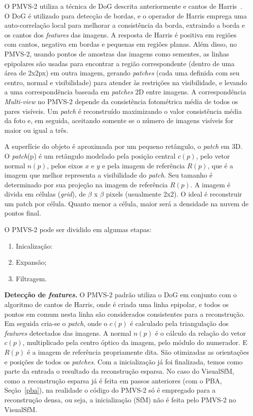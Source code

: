 O PMVS-2 utiliza a técnica de DoG descrita anteriormente e cantos de
Harris~\cite{Harris:Stephens:Edge:Corner}. O DoG é utilizado para detecção de
bordas, e o operador de Harris emprega uma auto-correlação local para
melhorar a consistência da borda, extraindo a borda e os cantos dos
\emph{features} das imagens. A resposta de Harris é positiva em regiões com
cantos, negativa em bordas e pequenas em regiões planas. Além disso, no PMVS-2,
usando pontos de amostras das imagens como sementes, as linhas epipolares são
usadas para encontrar a região correspondente (dentro de uma área de 2x2px) em
outra imagem, gerando \emph{patches} (cada uma definida com seu centro, normal e
visibilidade) para atender às restrições na visibilidade, e levando a uma
correspondência baseada em \emph{patches} 2D entre imagens. A correspondência
\emph{Multi-view} no PMVS-2 depende da
consistência fotométrica média de todos os pares visíveis. Um \emph{patch} é
reconstruído maximizando o valor consistência média da foto e, em
seguida, aceitando somente se o número de imagens visíveis for maior ou igual a
três.

A superfície do objeto é aproximada por um pequeno retângulo, o \emph{patch} em
3D.  O \emph{patch}(p) é um retângulo modelado pela posição central $c(p)$, pelo
vetor normal $n(p)$, pelos eixos $x$ e $y$ e pela imagem de referência $R(p)$,
que é a imagem que melhor representa a visibilidade do \emph{patch}. Seu
tamanho é determinado por sua projeção na imagem de referência $R(p)$.
A imagem é divida em células (\emph{grid}), de $\beta$ x $\beta$ pixels
(usualmente 2x2). O ideal é reconstruir um patch por célula. Quanto menor a
célula, maior será a densidade na nuvem de pontos final.

O PMVS-2 pode ser dividido em algumas etapas:
\begin{enumerate}[leftmargin=2.5cm]
\item{Inicalização:}
\item{Expansão;}
\item{Filtragem.}
\end{enumerate}

\noindent\textbf{Detecção de \emph{features}.}
O PMVS-2 padrão utiliza o DoG em conjunto com o algoritmo de cantos de Harris,
onde é criada uma linha epipolar, e todos os pontos em comum nesta linha são
considerados consistentes para a reconstrução.  Em seguida cria-se o
\emph{patch},
onde o $c(p)$ é calculado pela triangulação dos \emph{features} detectados das
imagens. A normal $n(p)$ é o cálculo da relação do vetor $c(p)$, multiplicado
pela centro óptico da imagem, pelo módulo do numerador. E $R(p)$ é a imagem de
referência propriamente dita. São otimizadas as orientações e posições de todos
os \emph{patches}. Com a inicialização já foi finalizada, temos como parte da
entrada o resultado da reconstrução esparsa. No caso do VisualSfM, como a
reconstrução esparsa já é feita em passos anteriores (com o PBA, Seção~\ref{pba}), na
realidade o código do PMVS-2 só é empregado para a reconstrução densa, ou seja, a
inicialização (SfM) não é feita pelo PMVS-2 no VisualSfM.


